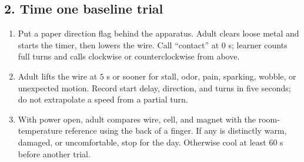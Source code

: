 {\subsection{2. Time one baseline trial}
\begin{enumerate}[resume]
\item Put a paper direction flag behind the apparatus. Adult clears loose metal and starts the timer, then lowers the wire. Call ``contact'' at \(0\) s; learner counts full turns and calls clockwise or counterclockwise from above.
\item Adult lifts the wire at \(5\) s or sooner for stall, odor, pain, sparking, wobble, or unexpected motion. Record start delay, direction, and turns in five seconds; do not extrapolate a speed from a partial turn.
\item With power open, adult compares wire, cell, and magnet with the room-temperature reference using the back of a finger. If any is distinctly warm, damaged, or uncomfortable, stop for the day. Otherwise cool at least \(60\) s before another trial.
\end{enumerate}

\begin{center}\end{center}

}

